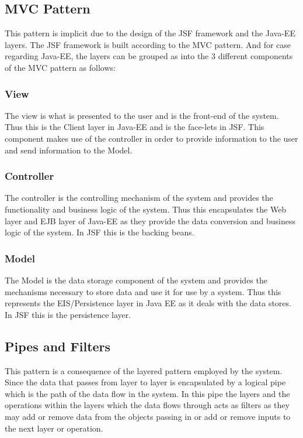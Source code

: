 \documentclass[12pt]{article}
\begin{document}
\subsection{MVC Pattern}
This pattern is implicit due to the design of the JSF framework and the Java-EE layers. The JSF framework is built according to the MVC pattern. And for case regarding Java-EE, the layers can be grouped as into the 3 different components of the MVC pattern as follows:

\subsubsection{View}
The view is what is presented to the user and is the front-end of the system. Thus this is the Client layer in Java-EE and is the face-lets in JSF. This component makes use of the controller in order to provide information to the user and send information to the Model.

\subsubsection{Controller}
The controller is the controlling mechanism of the system and provides the functionality and business logic of the system. Thus this encapsulates the Web layer and EJB layer of Java-EE as they provide the data conversion and business logic of the system. In JSF this is the backing beans.

\subsubsection{Model}
The Model is the data storage component of the system and provides the mechanisms necessary to store data and use it for use by a system. Thus this represents the EIS/Persistence layer in Java EE as it deals with the data stores. In JSF this is the persistence layer.

\subsection{Pipes and Filters}
This pattern is a consequence of the layered pattern employed by the system. Since the data that passes from layer to layer is encapsulated by a logical pipe which is the path of the data flow in the system. In this pipe the layers and the operations within the layers which the data flows through acts as filters as they may add or remove data from the objects passing in or add or remove inputs to the next layer or operation.  
\end{document}
